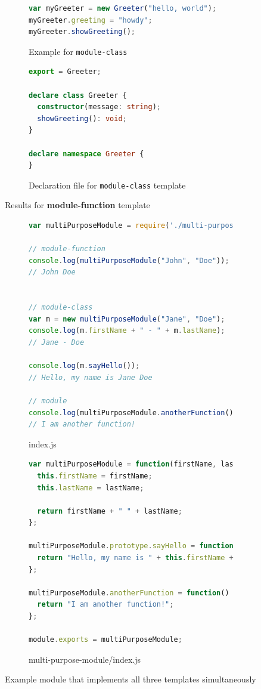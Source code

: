\documentclass[a4paper,english,cleveref, autoref]{lipics-v2019}
\begin{document}
\begin{figure}[tp]
\begin{subfigure}{0.48\linewidth}
\begin{lstlisting}[language=JavaScript]
var myGreeter = new Greeter("hello, world");
myGreeter.greeting = "howdy";
myGreeter.showGreeting();
      \end{lstlisting}
      \caption{Example for \texttt{module-class}}
    \end{subfigure}
    \hfill
    \begin{subfigure}{0.48\linewidth}
      \begin{lstlisting}[language=TypeScript]
export = Greeter;

declare class Greeter {
  constructor(message: string);
  showGreeting(): void;
}

declare namespace Greeter {
}
      \end{lstlisting}
      \caption{Declaration file for \texttt{module-class} template}
    \end{subfigure}

  \caption{Results for \textbf{module-function} template}
  \label{fig:typescript-templates-by-example}
\end{figure}

\begin{figure}[tp]
  \centering
  \begin{subfigure}{0.80\linewidth}
      \begin{lstlisting}[language=JavaScript]
var multiPurposeModule = require('./multi-purpose-module');

// module-function
console.log(multiPurposeModule("John", "Doe"));
// John Doe


// module-class
var m = new multiPurposeModule("Jane", "Doe");
console.log(m.firstName + " - " + m.lastName);
// Jane - Doe

console.log(m.sayHello());
// Hello, my name is Jane Doe

// module
console.log(multiPurposeModule.anotherFunction());
// I am another function! 
      \end{lstlisting}
      \caption{index.js}
    \end{subfigure}

    \begin{subfigure}{0.80\linewidth}
      \begin{lstlisting}[language=TypeScript]
var multiPurposeModule = function(firstName, lastName) {
  this.firstName = firstName;
  this.lastName = lastName;

  return firstName + " " + lastName;
};

multiPurposeModule.prototype.sayHello = function() {
  return "Hello, my name is " + this.firstName + " " + this.lastName;
};

multiPurposeModule.anotherFunction = function() {
  return "I am another function!";
};

module.exports = multiPurposeModule;   
      \end{lstlisting}
      \caption{multi-purpose-module/index.js}
    \end{subfigure}
  \caption{Example module that implements all three templates simultaneously}
  \label{fig:multi-purpose-module-example}
\end{figure}
\end{document}
